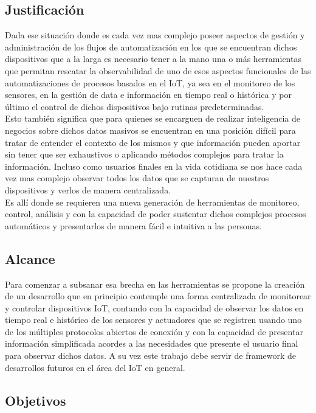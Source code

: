 \subsection{Justificación}
Dada ese situación donde es cada vez mas complejo poseer aspectos de gestión y administración de los flujos de automatización en los que se encuentran dichos dispositivos que a la larga es necesario tener a la mano una o más herramientas que permitan rescatar la observabilidad de uno de esos aspectos funcionales de las automatizaciones de procesos basados en el IoT, ya sea en el monitoreo de los sensores, en la gestión de data e información en tiempo real o histórica y por último el control de dichos dispositivos bajo rutinas predeterminadas.\\

Esto también significa que para quienes se encarguen de realizar inteligencia de negocios sobre dichos datos masivos se encuentran en una posición difícil para tratar de entender el contexto de los mismos y que información pueden aportar sin tener que ser exhaustivos o aplicando métodos complejos para tratar la información. Incluso como usuarios finales en la vida cotidiana se nos hace cada vez mas complejo observar todos los datos que se capturan de nuestros dispositivos y verlos de manera centralizada.\\

Es allí donde se requieren una nueva generación de herramientas de monitoreo, control, análisis  y con la capacidad de poder sustentar dichos complejos procesos automáticos y presentarlos de manera fácil e intuitiva a las personas.

\subsection{Alcance}
Para comenzar a subsanar esa brecha en las herramientas se propone la creación de un desarrollo que en principio contemple una forma centralizada de monitorear y controlar dispositivos IoT, contando con la capacidad de observar los datos en tiempo real e histórico de los sensores y actuadores que se registren usando uno de los múltiples protocolos abiertos de conexión y con la capacidad de presentar información simplificada acordes a las necesidades que presente el usuario final para observar dichos datos. A su vez este trabajo debe servir de framework de desarrollos futuros en el área del IoT en general.
 
\subsection{Objetivos}

